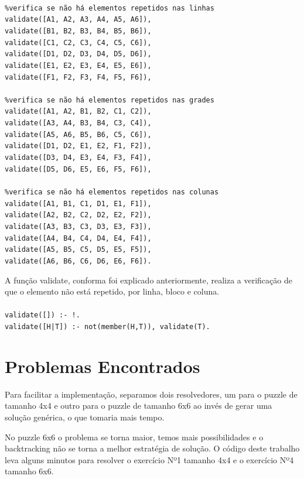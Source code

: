 \documentclass{article}
\begin{document}
\texttt{
    \\
    \%verifica se não há elementos repetidos nas linhas\\
	validate([A1, A2, A3, A4, A5, A6]),\\
	validate([B1, B2, B3, B4, B5, B6]),\\
	validate([C1, C2, C3, C4, C5, C6]),\\
	validate([D1, D2, D3, D4, D5, D6]),\\
	validate([E1, E2, E3, E4, E5, E6]),\\
	validate([F1, F2, F3, F4, F5, F6]),\\
 	\\
	\%verifica se não há elementos repetidos nas grades\\
	validate([A1, A2, B1, B2, C1, C2]),\\
	validate([A3, A4, B3, B4, C3, C4]),\\
	validate([A5, A6, B5, B6, C5, C6]),\\
	validate([D1, D2, E1, E2, F1, F2]),\\
	validate([D3, D4, E3, E4, F3, F4]),\\
	validate([D5, D6, E5, E6, F5, F6]),\\
    \\
	\%verifica se não há elementos repetidos nas colunas\\
	validate([A1, B1, C1, D1, E1, F1]),\\
	validate([A2, B2, C2, D2, E2, F2]),\\
	validate([A3, B3, C3, D3, E3, F3]),\\
	validate([A4, B4, C4, D4, E4, F4]),\\
	validate([A5, B5, C5, D5, E5, F5]),\\
	validate([A6, B6, C6, D6, E6, F6]).\\}
	
A função validate, conforma foi explicado anteriormente, realiza a verificação de que o elemento não está repetido, por linha, bloco e coluna.
\\
\\
\texttt{validate([]) :- !.\\
	validate([H|T]) :- not(member(H,T)), validate(T).}

\section{Problemas Encontrados}

Para facilitar a implementação, separamos dois resolvedores, um para o puzzle de tamanho 4x4 e outro para o puzzle de tamanho 6x6 ao invés de gerar uma solução genérica, o que tomaria mais tempo.

No puzzle 6x6 o problema se torna maior, temos mais possibilidades e o backtracking não se torna a melhor estratégia de solução. O código deste trabalho leva alguns minutos para resolver o exercício Nº1 tamanho 4x4 e o exercício Nº4 tamanho 6x6.
\end{document}
